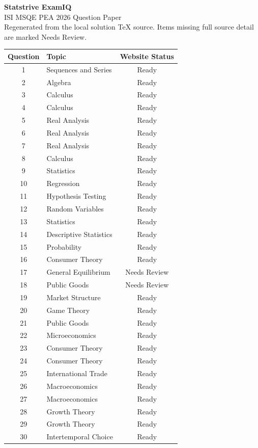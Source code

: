 \documentclass[11pt]{article}
\begin{document}
\begin{center}
{\Huge \textbf{Statstrive ExamIQ}}\\[6pt]
{\Large ISI MSQE PEA 2026 Question Paper}\\[4pt]
{\small Regenerated from the local solution TeX source. Items missing full source detail are marked Needs Review.}
\end{center}

\vspace{0.5cm}
\begin{longtable}{c l c}
\toprule
Question & Topic & Website Status \\
\midrule
\endhead
1 & Sequences and Series & Ready \\
2 & Algebra & Ready \\
3 & Calculus & Ready \\
4 & Calculus & Ready \\
5 & Real Analysis & Ready \\
6 & Real Analysis & Ready \\
7 & Real Analysis & Ready \\
8 & Calculus & Ready \\
9 & Statistics & Ready \\
10 & Regression & Ready \\
11 & Hypothesis Testing & Ready \\
12 & Random Variables & Ready \\
13 & Statistics & Ready \\
14 & Descriptive Statistics & Ready \\
15 & Probability & Ready \\
16 & Consumer Theory & Ready \\
17 & General Equilibrium & Needs Review \\
18 & Public Goods & Needs Review \\
19 & Market Structure & Ready \\
20 & Game Theory & Ready \\
21 & Public Goods & Ready \\
22 & Microeconomics & Ready \\
23 & Consumer Theory & Ready \\
24 & Consumer Theory & Ready \\
25 & International Trade & Ready \\
26 & Macroeconomics & Ready \\
27 & Macroeconomics & Ready \\
28 & Growth Theory & Ready \\
29 & Growth Theory & Ready \\
30 & Intertemporal Choice & Ready \\
\bottomrule
\end{longtable}
\end{document}
